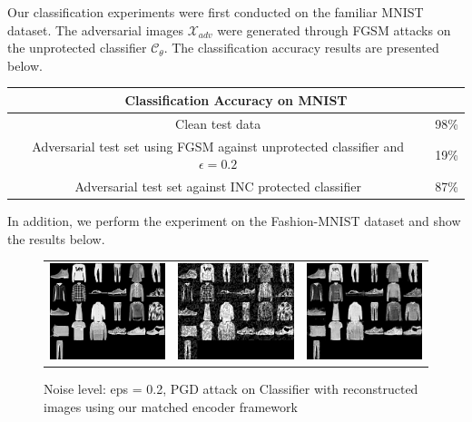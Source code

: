 \documentclass{article}
\theoremstyle{definition}
\begin{document}
Our classification experiments were first conducted on the familiar MNIST dataset. The adversarial images $\mathcal{X}_{adv}$ were generated through FGSM attacks on the unprotected classifier $\mathcal{C}_{\theta}$. The classification accuracy results
are presented below.



\begin{center}
\begin{tabular}{ |c|c|}
 \hline
  \multicolumn{2}{|c|}{Classification Accuracy on MNIST}\\
 \hline
 Clean test data & 98\% \\ 
 \hline
 Adversarial test set using FGSM against unprotected classifier and $\epsilon = 0.2$ & 19\% \\ 
 \hline
 Adversarial test set against INC protected classifier & 87\% \\ 
 \hline
\end{tabular}
\end{center}

In addition, we perform the experiment on the Fashion-MNIST dataset and show the results below.

\begin{figure}[H]
\centering
\begin{tabular}{ccc}
\includegraphics[width=2in]{f_mnist_original.png} &
\includegraphics[width=2in]{f_mnist_adversarial.png} &
\includegraphics[width=2in]{f_mnist_reconstr_encoded.png} 
\end{tabular}
\caption{Noise level: eps = 0.2, PGD attack on Classifier with reconstructed images using our matched encoder framework}
\end{figure}
\end{document}
